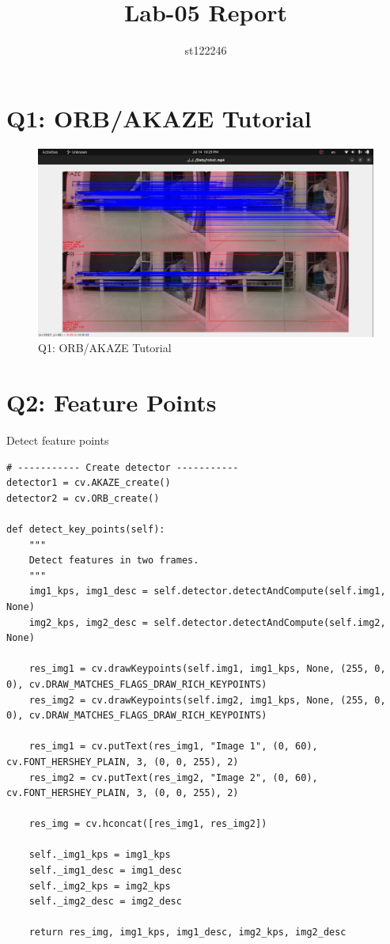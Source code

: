 \documentclass[a4paper, 12pt]{article}
\title{Lab-05 Report}
\author{st122246}
\begin{document}
	\maketitle

	\section{Q1: ORB/AKAZE Tutorial}

	\begin{figure}
		\caption{Q1: ORB/AKAZE Tutorial}
		\includegraphics[scale=0.25]{img/akaze_orb.png}
	\end{figure}

	\section{Q2:  Feature Points}	
	
    Detect feature points
    \begin{lstlisting}
# ----------- Create detector -----------
detector1 = cv.AKAZE_create()
detector2 = cv.ORB_create()

def detect_key_points(self):
    """
    Detect features in two frames.
    """
    img1_kps, img1_desc = self.detector.detectAndCompute(self.img1, None)
    img2_kps, img2_desc = self.detector.detectAndCompute(self.img2, None)

    res_img1 = cv.drawKeypoints(self.img1, img1_kps, None, (255, 0, 0), cv.DRAW_MATCHES_FLAGS_DRAW_RICH_KEYPOINTS)
    res_img2 = cv.drawKeypoints(self.img2, img1_kps, None, (255, 0, 0), cv.DRAW_MATCHES_FLAGS_DRAW_RICH_KEYPOINTS)

    res_img1 = cv.putText(res_img1, "Image 1", (0, 60), cv.FONT_HERSHEY_PLAIN, 3, (0, 0, 255), 2)
    res_img2 = cv.putText(res_img2, "Image 2", (0, 60), cv.FONT_HERSHEY_PLAIN, 3, (0, 0, 255), 2)

    res_img = cv.hconcat([res_img1, res_img2])

    self._img1_kps = img1_kps
    self._img1_desc = img1_desc
    self._img2_kps = img2_kps
    self._img2_desc = img2_desc

    return res_img, img1_kps, img1_desc, img2_kps, img2_desc
    \end{lstlisting}
\end{document}
